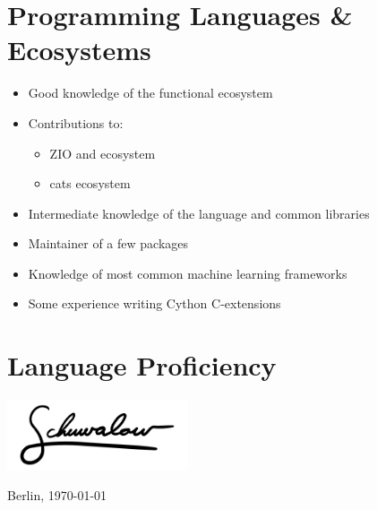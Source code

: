 \documentclass[10pt,a4paper,sans]{moderncv}
\begin{document}
\section{Programming Languages \& Ecosystems}
 {
  \begin{itemize}
    \item Good knowledge of the functional ecosystem
    \item Contributions to:
    \begin{itemize}
        \item ZIO and ecosystem
        \item cats ecosystem
    \end{itemize}
  \end{itemize}
}
 {
  \begin{itemize}
      \item Intermediate knowledge of the language and common libraries
  \end{itemize}
}
 {
  \begin{itemize}
      \item Maintainer of a few packages
  \end{itemize}
}
 {
  \begin{itemize}
    \item Knowledge of most common machine learning frameworks
    \item Some experience writing Cython C-extensions
  \end{itemize}
}

\section{Language Proficiency}

\emptysection{}\closesection
\vfill
\vspace{-1cm}
\begin{flushright}
  \includegraphics[width=0.4\textwidth]{signature}

  Berlin, \today
\end{flushright}
\end{document}
